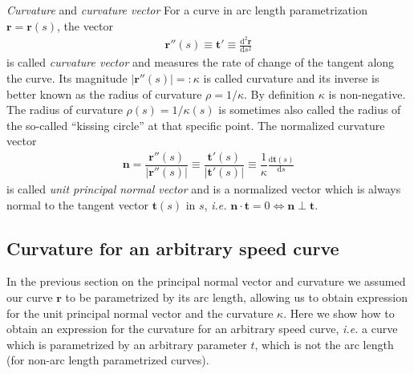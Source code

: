 \documentclass[11pt, DINA4, fleqn]{amsart}
\def\df{\mathrm{d}\xspace}
\newcommand{\dd}[2]{\frac{\df#1}{\df#2}}
\newcommand{\ddd}[2]{\frac{\df^2#1}{\df#2^2}}
\def\vr{\boldsymbol{r}\xspace}
\def\vrpp{{\vr}''\xspace}
\def\vt{\boldsymbol{t}\xspace}
\def\vn{\boldsymbol{n}\xspace}
\begin{document}
\begin{mybox_tc3}{\emph{Curvature} and \emph{curvature vector}}
	For a curve in arc length parametrization $\vr = \vr(s)$, the vector
	\begin{align}
	\vrpp(s) \equiv \vt' \equiv \ddd{\vr}{s}
	\end{align}
	is called \emph{curvature vector} and measures the rate of change of the tangent along the curve.
	Its magnitude $|\vrpp(s)| =: \kappa$ is called curvature and its inverse is better known as the radius of curvature $\rho = 1/\kappa$.
	By definition $\kappa$ is non-negative.
	The radius of curvature $\rho(s) = 1/\kappa(s)$ is sometimes also called the radius of the so-called ``kissing circle'' at that specific point.
	The normalized curvature vector
	\begin{align}
	\vn = \dfrac{\vrpp(s)}{|\vrpp(s)|} \equiv \dfrac{\vt'(s)}{|\vt'(s)|}
	\equiv \dfrac{1}{\kappa}\dd{\vt(s)}{s}
	\label{eq:normalVectorBox}
	\end{align}
	is called \emph{unit principal normal vector} and is a normalized vector which is always normal to the tangent vector $\vt(s)$ in $s$, \textit{i.e.}
	$\vn\cdot\vt = 0 \Longleftrightarrow \vn \perp \vt$.
\end{mybox_tc3}

\subsection{Curvature for an arbitrary speed curve}
In the previous section on the principal normal vector and curvature we assumed our curve $\vr$ to be parametrized by its
arc length, allowing us to obtain expression for the unit principal normal vector and the curvature $\kappa$.
Here we show how to obtain an expression for the curvature for an arbitrary speed curve, \textit{i.e.} a curve which is parametrized by an arbitrary parameter $t$, which is not the arc length (for non-arc length parametrized curves).
\end{document}
